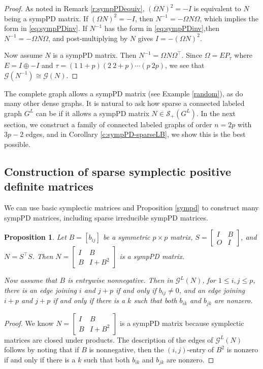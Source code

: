 \documentclass[12pt]{article}
\newtheorem{prop}[thm]{Proposition}
\theoremstyle{definition}
\theoremstyle{definition}
\theoremstyle{definition}
\numberwithin{figure}{section}
\numberwithin{equation}{section}
\newcommand{\G}{\mathcal{G}}
\newcommand{\symp}{\mathcal{S}_+}
\newcommand{\trans}{^{\top}}
\newcommand{\mtx}[1]{\begin{bmatrix} #1 \end{bmatrix}}
\newcommand{\bpf}{\begin{proof}}
\newcommand{\epf}{\end{proof}\ms}
\newcommand{\ms}{\medskip}
\begin{document}
\bpf As noted in Remark \ref{r:sympPDequiv},
 $(\Omega N)^2=-I$ is equivalent to $N$ being a sympPD matrix.  If $(\Omega N)^2=-I$, then $N^{-1}= -\Omega N\Omega$, which implies the  form in \eqref{eq:sympPDinv}.  If  $N^{-1}$ has the form in \eqref{eq:sympPDinv},then $N^{-1}=-\Omega N \Omega$, and post-multiplying 
by $N$ gives $I=-(\Omega N)^2$.   

\ms  Now assume $N$ is a sympPD matrix. Then $N^{-1}=\Omega N \Omega\trans$.  Since  $\Omega=EP_\tau$ where $E=I\oplus -I$ 
 and $\tau=(1\ 1\!+\!p)(2\ 2\!+\!p)\cdots(p\ 2p)$, we see that
$\G(N^{-1})\cong \G(N)$. 
\epf



The complete graph allows a sympPD matrix {(see Example \ref{random})}, as do many other dense graphs.  It is natural to ask how   sparse  a connected labeled graph $G^L$ can be if it allows a sympPD matrix  $N\in \symp(G^L)$.  In the next section, we construct a family of {connected} labeled graphs of order $n=2p$ with $3p-2$ edges, and in Corollary \ref{c:sympPD-sparseLB}, we show this is the best possible.





\subsection{Construction of sparse symplectic positive definite matrices} \label{ss:TPn}

We can use basic symplectic matrices and   Proposition \ref{sympd} to construct 
many sympPD matrices, including sparse  irreducible sympPD matrices.


\begin{prop}\label{p:IBOBsympPD}
Let $B=[b_{ij}]$ be a symmetric $p\times p$ matrix,  $S=\mtx{I & B\\O & I}$, and  $N=S\trans S$.
 Then  
$N=\mtx{ I & B \\
      B & I + B^2 }
   $
is a sympPD matrix. 

Now assume that $B$ is entrywise nonnegative. Then in 
$\G^L(N)$,  
 for $1\le i,j\le p$, there is an edge joining $i$ and $j+p$ if and only if $b_{ij}\neq 0$,
and an edge joining $i+p$ and $j+p$ if and only if there is a $k$ such that both $b_{ik}$ and $b_{jk}$ 
are nonzero. 
\end{prop}

\begin{proof}
{We know $N=\mtx{ I & B \\
      B & I + B^2 }
   $ is a sympPD matrix because symplectic matrices are closed under products.}
 {The description of the edges of 
$\G^L(N)$} follows by noting that if $B$ is nonnegative, then the $(i,j)$-entry of 
$B^2$ is nonzero if and only if there is a $k$ such that both $b_{ik}$ and $b_{jk}$ are nonzero. 
\end{proof} 
\end{document}
